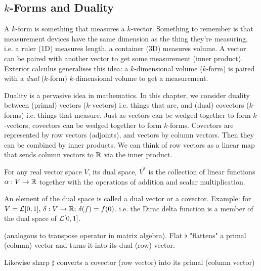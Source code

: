 \subsection{$k$-Forms and Duality}

A $k$-form is something that measures a $k$-vector. Something to remember is that measurement devices have the same dimension as the thing they're measuring, i.e. a ruler (1D) measures length, a container (3D) measures volume. A vector can be paired with another vector to get some measurement (inner product). Exterior calculus generalises this idea: a $k$-dimensional volume ($k$-form) is paired with a \textit{dual} ($k$-form) $k$-dimensional volume to get a measurement.

Duality is a pervasive idea in mathematics. In this chapter, we consider duality between (primal) vectors ($k$-vectors) i.e. things that are, and (dual) covectors ($k$-forms) i.e. things that measure. Just as vectors can be wedged together to form $k$-vectors, covectors can be wedged together to form $k$-forms. Covectors are represented by row vectors (adjoints), and vectors by column vectors. Then they can be combined by inner products. We can think of row vectors as a linear map that sends column vectors to $\mathbb{R}$ via the inner product.

\begin{definition}
    For any real vector space $V$, its dual space, $V^*$ is the collection of linear functions $\alpha:V\rightarrow \mathbb{R}$ together with the operations of addition and scalar multiplication.
\end{definition}

An element of the dual space is called a dual vector or a covector. Example: for $V = \mathcal{L}[0,1],\, \delta:V\rightarrow\mathbb{R};\, \delta(f)=f(0)$. i.e. the Dirac delta function is a member of the dual space of $\mathcal{L}[0,1]$.

\begin{definition}
    (analogous to transpose operator in matrix algebra). Flat $\flat$ "flattens" a primal (column) vector and turns it into its dual (row) vector.
    
    
    Likewise sharp $\sharp$ converts a covector (row vector) into its primal (column vector)
    \eqn{
        \alpha,\beta \rightarrow^\sharp \alpha(\beta^\sharp)
    }
\end{definition}

